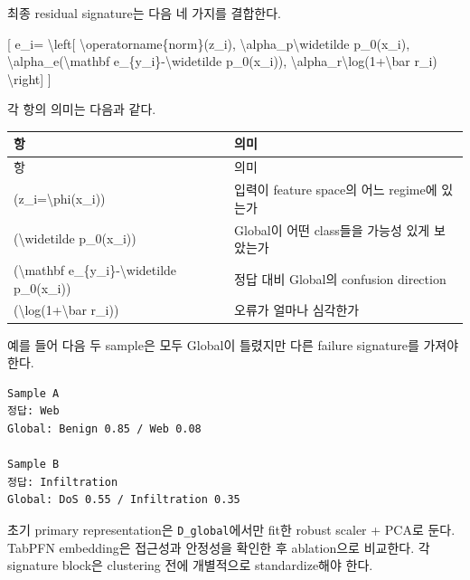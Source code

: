 최종 residual signature는 다음 네 가지를 결합한다.

[ e\_\allowbreak{}i=\allowbreak{} \textbackslash{}left[ \textbackslash{}operatorname\{norm\}(z\_\allowbreak{}i), \textbackslash{}alpha\_\allowbreak{}p\textbackslash{}widetilde p\_\allowbreak{}0(x\_\allowbreak{}i), \textbackslash{}alpha\_\allowbreak{}e(\textbackslash{}mathbf e\_\allowbreak{}\{y\_\allowbreak{}i\}-\textbackslash{}widetilde p\_\allowbreak{}0(x\_\allowbreak{}i)), \textbackslash{}alpha\_\allowbreak{}r\textbackslash{}log(1+\allowbreak{}\textbackslash{}bar r\_\allowbreak{}i) \textbackslash{}right] ]

각 항의 의미는 다음과 같다.

\begingroup
\footnotesize
\begin{longtable}{>{\raggedright\arraybackslash}p{}>{\raggedright\arraybackslash}p{}}
\toprule
항 & 의미 \\ \midrule
\endfirsthead
항 & 의미 \\ \midrule
\endhead
{}(z\_\allowbreak{}i=\allowbreak{}\textbackslash{}phi(x\_\allowbreak{}i)) & 입력이 feature space의 어느 regime에 있는가 \\
{}(\textbackslash{}widetilde p\_\allowbreak{}0(x\_\allowbreak{}i)) & Global이 어떤 class들을 가능성 있게 보았는가 \\
{}(\textbackslash{}mathbf e\_\allowbreak{}\{y\_\allowbreak{}i\}-\textbackslash{}widetilde p\_\allowbreak{}0(x\_\allowbreak{}i)) & 정답 대비 Global의 confusion direction \\
{}(\textbackslash{}log(1+\allowbreak{}\textbackslash{}bar r\_\allowbreak{}i)) & 오류가 얼마나 심각한가 \\
\bottomrule
\end{longtable}
\endgroup
예를 들어 다음 두 sample은 모두 Global이 틀렸지만 다른 failure signature를 가져야 한다.


\begin{Verbatim}[breaklines=true,breakanywhere=true,fontsize=\scriptsize]
Sample A
정답: Web
Global: Benign 0.85 / Web 0.08

Sample B
정답: Infiltration
Global: DoS 0.55 / Infiltration 0.35

\end{Verbatim}
초기 primary representation은 \texttt{D\_\allowbreak{}\allowbreak{}global\allowbreak{}}에서만 fit한 robust scaler +\allowbreak{} PCA로 둔다. TabPFN embedding은 접근성과 안정성을 확인한 후 ablation으로 비교한다. 각 signature block은 clustering 전에 개별적으로 standardize해야 한다.


